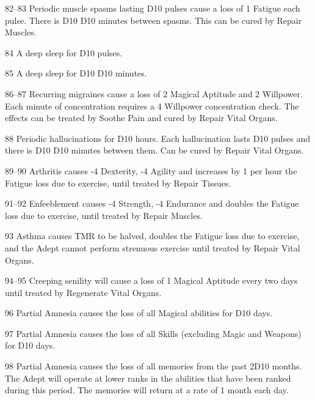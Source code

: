 \begin{multicols}{3}
\begin{Description}
\item[82--83] Periodic muscle spasms lasting D10 pulses cause a loss of
1 Fatigue each pulse.  There is D10 \x D10 minutes between spasms.
This can be cured by Repair Muscles.

\item[84] A deep sleep for D10 pulses.

\item[85] A deep sleep for D10 \x D10 minutes.

\item[86--87] Recurring migraines cause a loss of 2 Magical Aptitude
and 2 Willpower.  Each minute of concentration requires a 4 \x
Willpower concentration check.  The effects can be treated by Soothe
Pain and cured by Repair Vital Organs.

\item[88] Periodic hallucinations for D10 hours. Each hallucination
lasts D10 pulses and there is D10 \x D10 minutes between them.  Can be
cured by Repair Vital Organs.

\item[89--90] Arthritis causes -4 Dexterity, -4 Agility and increases
by 1 per hour the Fatigue loss due to exercise, until treated by
Repair Tissues.

\item[91--92] Enfeeblement causes -4 Strength, -4 Endurance and
doubles the Fatigue loss due to exercise, until treated by Repair
Muscles.

\item[93] Asthma causes TMR to be halved, doubles the Fatigue loss due
to exercise, and the Adept cannot perform strenuous exercise until
treated by Repair Vital Organs.

\item[94--95] Creeping senility will cause a loss of 1 Magical Aptitude
every two days until treated by Regenerate Vital Organs.

\item[96] Partial Amnesia causes the loss of all Magical abilities for
D10 days.

\item[97] Partial Amnesia causes the loss of all Skills (excluding
Magic and Weapons) for D10 days.

\item[98] Partial Amnesia causes the loss of all memories from the past
2D10 months.  The Adept will operate at lower ranks in the abilities
that have been ranked during this period.  The memories will return at
a rate of 1 month each day.


\end{Description}
\end{multicols}

